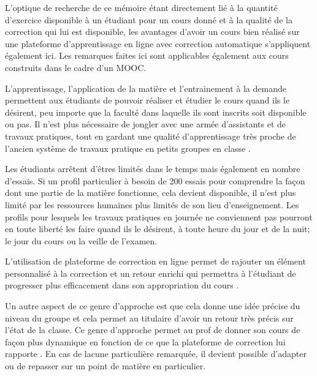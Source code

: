 \documentclass[a4paper]{report}
\begin{document}
L'optique de recherche de ce mémoire étant directement lié à la quantité d'exercice disponible à un étudiant pour un cours donné et à la qualité de la correction qui lui est disponible, les avantages d'avoir un cours bien réalisé sur une plateforme d'apprentissage en ligne avec correction automatique s'appliquent également ici.
Les remarques faites ici sont applicables également aux cours construits dans le cadre d'un MOOC.

L'apprentissage, l'application de la matière et l'entrainement à la demande permettent aux étudiants de pouvoir réaliser et étudier le cours quand ils le désirent, peu importe que la faculté dans laquelle ils sont inscrits soit disponible ou pas.
Il n'est plus nécessaire de jongler avec une armée d'assistants et de travaux pratiques, tout en gardant une qualité d'apprentissage très proche de l'ancien système de travaux pratique en petits groupes en classe \cite{derval2015automatic}.

Les étudiants arrêtent d'êtres limités dans le temps mais également en nombre d'essais.
Si un profil particulier à besoin de 200 essais pour comprendre la façon dont une partie de la matière fonctionne, cela devient disponible, il n'est plus limité par les ressources humaines plus limités de son lieu d'enseignement.
Les profils pour lesquels les travaux pratiques en journée ne conviennent pas pourront en toute liberté les faire quand ils le désirent, à toute heure du jour et de la nuit; le jour du cours ou la veille de l'examen.

L'utilisation de plateforme de correction en ligne permet de rajouter un élément personnalisé à la correction et un retour enrichi qui permettra à l'étudiant de progresser plus efficacement dans son appropriation du cours \cite{Derval2022}.

Un autre aspect de ce genre d'approche est que cela donne une idée précise du niveau du groupe et cela permet au titulaire d'avoir un retour très précis sur l'état de la classe.
Ce genre d'approche permet au prof de donner son cours de façon plus dynamique en fonction de ce que la plateforme de correction lui rapporte \cite{Martin}.
En cas de lacune particulière remarquée, il devient possible d'adapter ou de repasser sur un point de matière en particulier.
\end{document}
